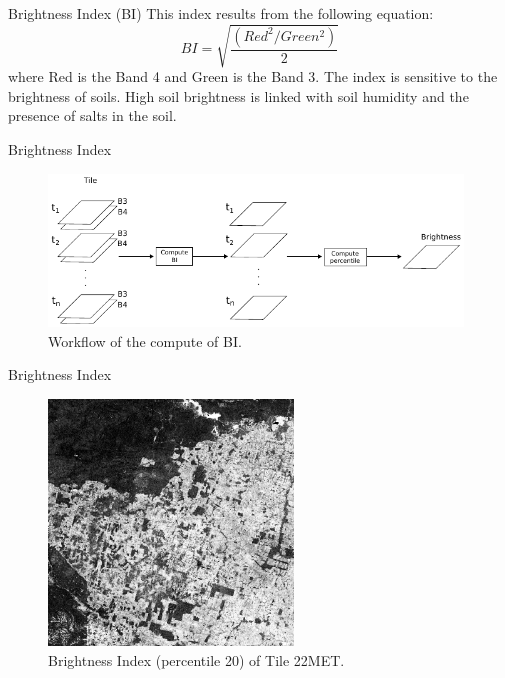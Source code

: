 \documentclass{beamer}
\begin{document}
\begin{frame}{Brightness Index (BI)}
    This index results from the following equation:
    \begin{equation}
        BI = \sqrt{\frac{ (Red^2 / Green^2)}{2}}
    \end{equation}
    where Red is the Band 4 and Green is the Band 3. The index 
    is sensitive to the brightness of soils. High soil brightness 
    is linked with soil humidity and the presence of salts in the 
    soil.
\end{frame} 

\begin{frame}{Brightness Index}
    \begin{figure}
        \includegraphics[width=11cm]{Figures/compute_BI.pdf}
        \caption{Workflow of the compute of BI.}  
        \centering
    \end{figure}
\end{frame} 

\begin{frame}{Brightness Index}
    \begin{figure}
        \includegraphics[width=6.5cm]{Figures/BI_22MET.png}
        \caption{Brightness Index (percentile 20) of Tile 22MET.}  
        \centering
    \end{figure}
\end{frame} 
\end{document}
